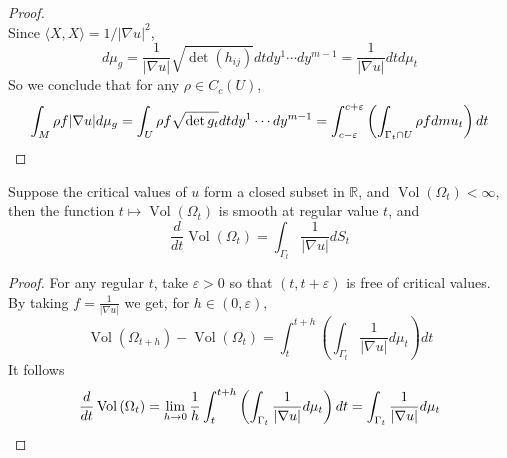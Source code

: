 \begin{enumerate}[label=\arabic{*}.]
\begin{proof}
\begin{equation*}
		\end{equation*}
		Since $\langle X, X\rangle={1}/{|\nabla u|^2}$,
		\begin{equation*}
			d \mu_g=\frac{1}{|\nabla u|} \sqrt{\operatorname{det}\left(h_{i j}\right)} d t d y^1 \cdots d y^{m-1}=\frac{1}{|\nabla u|} d t d \mu_t
		\end{equation*}
		So we conclude that for any $\rho \in C_c(U)$,
		\begin{equation*}
			\int_M \rho f|\nabla u| d \mu_g=\int_U \rho f \sqrt{\operatorname{det} g_t} d t d y^1 \cdots d y^{m-1}=\int_{c-\varepsilon}^{c+\varepsilon}\left(\int_{\Gamma_t \cap U} \rho f d mu_t\right) d t \qedhere
		\end{equation*}
	\end{proof}
	\begin{cor}
		Suppose the critical values of $u$ form a closed subset in $\mathbb{R}$, and $\operatorname{Vol}\left(\Omega_t\right)<\infty$, then the function $t \mapsto \operatorname{Vol}\left(\Omega_t\right)$ is smooth at regular value $t$, and
		\begin{equation*}
			\frac{d}{d t} \operatorname{Vol}\left(\Omega_t\right)=\int_{\Gamma_t} \frac{1}{|\nabla u|} d S_t
		\end{equation*}
	\end{cor}
	\begin{proof}
		For any regular $t$, take $\varepsilon>0$ so that $(t, t+\varepsilon)$ is free of critical values. By taking $f=\frac{1}{|\nabla u|}$ we get, for $h \in(0, \varepsilon)$,
		\begin{equation*}
			\operatorname{Vol}\left(\Omega_{t+h}\right)-\operatorname{Vol}\left(\Omega_t\right)=\int_t^{t+h}\left(\int_{\Gamma_t} \frac{1}{|\nabla u|} d \mu_t\right) d t
		\end{equation*}
		It follows
		\begin{equation*}
			\frac{d}{d t} \operatorname{Vol}\left(\Omega_t\right)=\lim _{h \rightarrow 0} \frac{1}{h} \int_t^{t+h}\left(\int_{\Gamma_t} \frac{1}{|\nabla u|} d \mu_t\right) d t=\int_{\Gamma_t} \frac{1}{|\nabla u|} d \mu_t \qedhere
		\end{equation*}
	\end{proof}


\end{enumerate}
